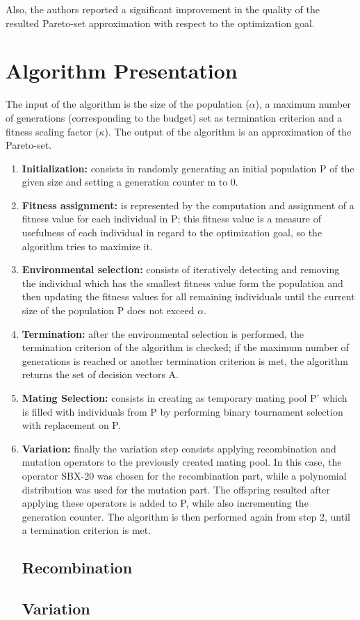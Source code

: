 \documentclass{sig-alternate}
\begin{document}
Also, the authors reported a significant improvement in the quality of the resulted Pareto-set approximation with respect to the optimization goal.

 \section{Algorithm Presentation}
The input of the algorithm is the size of the population ($\alpha$), a maximum number of generations (corresponding to the budget) set as termination criterion and a fitness scaling factor ($\kappa$). The output of the algorithm is an approximation of the Pareto-set.
\begin{enumerate}
\item \textbf{Initialization:} consists in randomly generating an initial population P of the given size  and setting a generation counter m to 0.
\item \textbf{Fitness assignment:} is represented by the computation and assignment of  a fitness value for each individual in P; this fitness value is a measure of usefulness of each individual in regard to the optimization goal, so the algorithm tries to maximize it.

\item \textbf{Environmental selection:} consists of iteratively detecting and removing  the individual which has the smallest fitness value form the population and then updating the fitness values for all remaining individuals  until the current size of the population P does not exceed $\alpha$.

\item \textbf{Termination:} after the environmental selection is performed, the termination criterion of the algorithm is checked; if the maximum number of generations is reached or another termination criterion is met, the algorithm returns the set of decision vectors A.

\item \textbf{Mating Selection:} consists in creating as temporary mating pool P’ which is filled with individuals from P by performing binary tournament selection with replacement on P.

\item \textbf{Variation:} finally the variation step consists applying recombination and mutation operators to the previously created mating pool. In this case, the operator SBX-20 was chosen for the recombination part, while a polynomial distribution was used for the mutation part.  The offspring resulted after applying these operators is added to P, while also incrementing the generation counter. The algorithm is then performed again from step 2, until a termination criterion is met.

\subsection{Recombination}

\subsection{Variation}
\end{enumerate}
\end{document}
